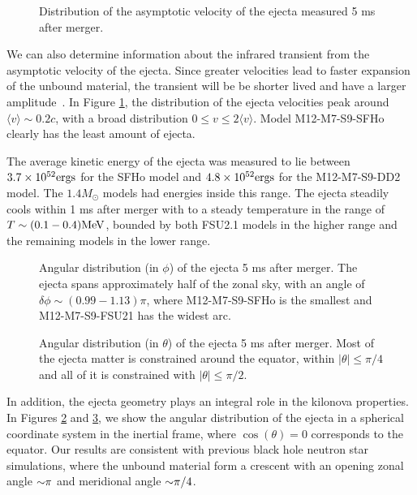 \begin{figure}
	\centering
	
	\caption[Distribution of the asymptotic velocity of the ejecta]{
		Distribution of the asymptotic velocity of the ejecta measured 5 ms after merger.
	}
	\label{fig:vrhisto}
\end{figure}

We can also determine information about the infrared transient from the asymptotic velocity of the ejecta.  
Since greater velocities lead to faster expansion of the unbound material, the transient will be be shorter lived and have a larger amplitude~\cite{2013ApJ...775...18B,Barnes:2016}. 
In Figure \ref{fig:vrhisto}, the distribution of the ejecta velocities peak around $\langle v \rangle \sim 0.2 c$, with a broad distribution  $ 0 \le v \le 2 \langle v \rangle $.
Model M12-M7-S9-SFHo clearly has the least amount of ejecta.

The average kinetic energy of the ejecta was measured to lie between $3.7 \times 10^{52} {\rm ergs} $ for the SFHo model and $4.8 \times 10^{52} {\rm ergs} $ for the M12-M7-S9-DD2 model.  
The $1.4 M_\odot$ models had energies inside this range. 
The ejecta steadily cools within 1 ms after merger with to a steady temperature in the range of $T \sim (0.1 - 0.4) {\rm MeV}$, bounded by both FSU2.1 models in the higher range and the remaining models in the lower range.

\begin{figure}
	\centering
	
	\caption[Angular distribution (in $\phi$) of the ejecta]{
		Angular distribution (in $\phi$) of the ejecta 5 ms after merger.  The ejecta spans approximately half of the zonal sky, with an angle of $\delta \phi \sim (0.99-1.13) \pi$, where M12-M7-S9-SFHo is the smallest and M12-M7-S9-FSU21 has the widest arc.
	}
	\label{fig:phihisto}
\end{figure}

\begin{figure}
	\centering
	
	\caption[Angular distribution (in $\theta$) of the ejecta]{
		Angular distribution (in $\theta$) of the ejecta 5 ms after merger.  
		Most of the ejecta matter is constrained around the equator, within $|\theta| \leq \pi/4$ and all of it is constrained with $|\theta| \leq \pi/2$.
	}
	\label{fig:costhetahisto}
\end{figure}


In addition, the ejecta geometry plays an integral role in the kilonova properties.  
In Figures \ref{fig:phihisto} and \ref{fig:costhetahisto}, we show the angular distribution of the ejecta in a spherical coordinate system in the inertial frame, where $\cos(\theta) = 0$ corresponds to the equator.  
Our results are consistent with previous black hole neutron star simulations, where the unbound material form a crescent with an opening zonal angle $\mathord{\sim} \pi$ and meridional angle $\mathord{\sim} \pi/4$.


